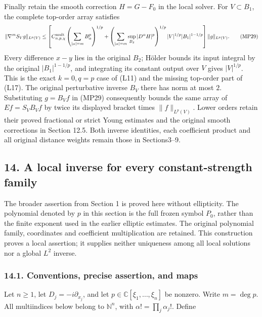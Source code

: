 \documentclass[
  11pt,
]{article}
\makeatletter
\let\ReaderOriginalAnchorStart\hyper@anchorstart
\let\ReaderOriginalAnchorEnd\hyper@anchorend
\let\ReaderPendingAliases\@empty
\def\ReaderArmAliases#1{\gdef\ReaderPendingAliases{#1}}
\def\hyper@anchorstart#1{\ReaderIfNativeAnchorTF{#1}{\ReaderPendingAliases\global\let\ReaderPendingAliases\@empty}{}\ReaderOriginalAnchorStart{#1}}
\makeatother
\begin{document}
Finally retain the smooth correction \(H=G-F_0\) in the local solver.
For \(V\subset B_1\), the complete top-order array satisfies \[
 \|\nabla^m S_Vg\|_{L^p(V)}
 \leq\left[
 C^{\rm mult}_{n,p,\chi}
       \left(\sum_{|\alpha|=m}B_\alpha^p\right)^{1/p}
 +\left(\sum_{|\alpha|=m}
                 \sup_{B_2}|D^\alpha H|^p\right)^{1/p}
       |V|^{1/p}|B_1|^{1-1/p}
 \right]\|g\|_{L^p(V)} .
                                                               \tag{MP29}
\] Every difference \(x-y\) lies in the original \(B_2\); Hölder bounds
its input integral by the original \(|B_1|^{1-1/p}\), and integrating
its constant output over \(V\) gives \(|V|^{1/p}\). This is the exact
\(k=0,q=p\) case of (L11) and the missing top-order part of (L17). The
original perturbative inverse \(B_V\) there has norm at most \(2\).
Substituting \(g=B_Vf\) in (MP29) consequently bounds the same array of
\(Ef=S_VB_Vf\) by twice its displayed bracket times \(\|f\|_{L^p(V)}\).
Lower orders retain their proved fractional or strict Young estimates
and the original smooth corrections in Section 12.5. Both inverse
identities, each coefficient product and all original distance weights
remain those in Sections3--9.

\ReaderArmAliases{\ReaderOriginalAnchorStart{a-local-inverse-for-every-constant-strength-family}\ReaderOriginalAnchorEnd}
\subsection{14. A local inverse for every constant-strength
family}\label{a-local-inverse-for-every-constant-strength-family}

The broader assertion from Section 1 is proved here without ellipticity.
The polynomial denoted by \(p\) in this section is the full frozen
symbol \(P_0\), rather than the finite exponent used in the earlier
elliptic estimates. The original polynomial family, coordinates and
coefficient multiplication are retained. This construction proves a
local assertion; it supplies neither uniqueness among all local
solutions nor a global \(L^2\) inverse.

\ReaderArmAliases{\ReaderOriginalAnchorStart{conventions-precise-assertion-and-maps}\ReaderOriginalAnchorEnd}
\subsubsection{14.1. Conventions, precise assertion, and
maps}\label{conventions-precise-assertion-and-maps}

Let \(n\geq1\), let \(D_j=-i\partial_{x_j}\), and let
\(p\in\mathbb C[\xi_1,\ldots,\xi_n]\) be nonzero. Write \(m=\deg p\).
All multiindices below belong to \(\mathbb N^n\), with
\(\alpha!=\prod_j\alpha_j!\). Define
\end{document}
